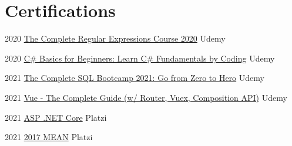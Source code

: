 \documentclass[letterpaper]{twentysecondcv} %
\begin{document}
\section{Certifications}
{
    \begin{twenty}
        
        
    
        
        
    
        \twentyitem
        {2020}
        {\href{http://ude.my/UC-c10e41d9-1c6f-44e5-9426-d4c40e385673}
            {The Complete Regular Expressions Course 2020}
        }
        {Udemy}
        {}
        
        \twentyitem
        {2020}
        {\href{http://ude.my/UC-d913aaf2-7f89-43bf-ab2d-a6d0192fd784}
            {C\# Basics for Beginners: Learn C\# Fundamentals by Coding}
        }
        {Udemy}
        {}
        
        \twentyitem
        {2021}
        {\href{http://ude.my/UC-a276cfba-5873-4f08-892b-ecd564b69cc7}
            {The Complete SQL Bootcamp 2021: Go from Zero to Hero}
        }
        {Udemy}
        {}
        
        \twentyitem
        {2021}
        {\href{http://ude.my/UC-6739b136-b8be-4568-ad89-7fd19bc0096d}
            {Vue - The Complete Guide (w/ Router, Vuex, Composition API)}}
        {Udemy}
        {}
        
        \twentyitem
        {2021}
        {\href{https://platzi.com/p/camurillo582/curso/1395-course/diploma/detalle}
            {ASP .NET Core}
        }
        {Platzi}
        {}
        
        \twentyitem
        {2021}
        {\href{https://platzi.com/p/camurillo582/curso/1182-mean-2017/diploma/detalle/}
            {2017 MEAN}
        }
        {Platzi}
        {}
        

\end{twenty}}
\end{document}
